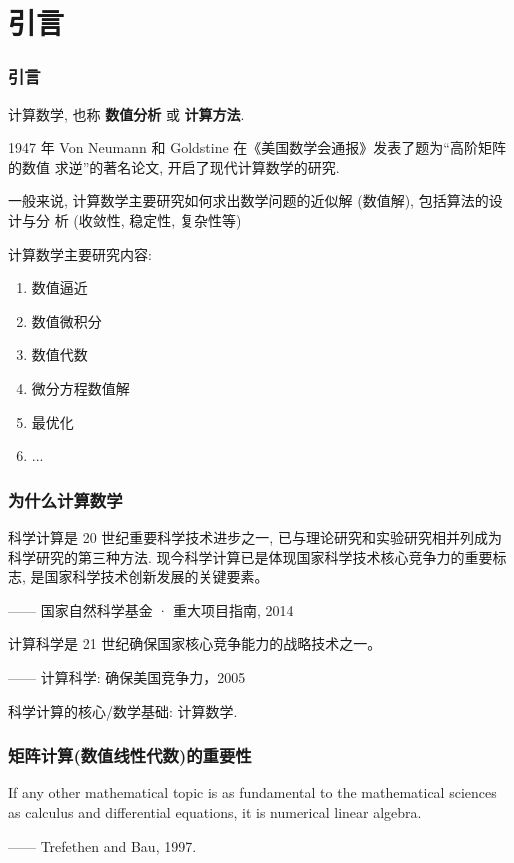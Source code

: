 \documentclass[notheorems,serif]{beamer}
\begin{document}
\section{引言}

\begin{frame}
\frametitle{引言}
计算数学, 也称 {\bf 数值分析} 或 {\bf 计算方法}.

1947 年 Von Neumann 和 Goldstine 在《美国数学会通报》发表了题为“高阶矩阵的数值
求逆”的著名论文, 开启了现代计算数学的研究.


一般来说, 计算数学主要研究如何求出数学问题的近似解 (数值解), 包括算法的设计与分
析 (收敛性, 稳定性, 复杂性等)
	
计算数学主要研究内容:
	
\begin{enumerate}
    \item 数值逼近
    \item 数值微积分
    \item 数值代数
    \item 微分方程数值解
    \item 最优化
    \item ...
\end{enumerate}
\end{frame}

\begin{frame}
\frametitle{为什么计算数学}
科学计算是 20 世纪重要科学技术进步之一, 已与理论研究和实验研究相并列成为科学研究的第三种方法. 现今科学计算已是体现国家科学技术核心竞争力的重要标志, 是国家科学技术创新发展的关键要素。

\qquad \qquad \qquad \qquad \qquad \qquad  —— 国家自然科学基金 · 重大项目指南, 2014

计算科学是 21 世纪确保国家核心竞争能力的战略技术之一。

\qquad \qquad \qquad \qquad \qquad \qquad    —— 计算科学: 确保美国竞争力，2005

科学计算的核心/数学基础: 计算数学.
\end{frame}

\begin{frame}
\frametitle{矩阵计算(数值线性代数)的重要性}
If any other mathematical topic is as fundamental to the mathematical
sciences as calculus and differential equations, it is numerical linear
algebra.

\qquad \qquad \qquad \qquad \qquad \qquad \qquad\qquad—— Trefethen and Bau, 1997.
\end{frame}
\end{document}
